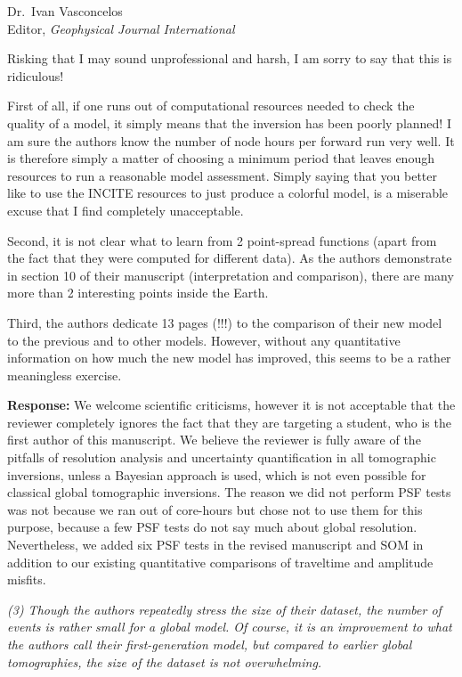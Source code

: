 \documentclass[11pt,a4paper]{letter}
\newcommand{\response}[1]{\textbf{Response:} #1}
\newcommand{\rev}[1]{{\it{#1}}}
\begin{document}
\begin{letter}{Dr.~Ivan Vasconcelos\\
Editor, \textit{Geophysical Journal International}}
{Risking that I may sound unprofessional and harsh, I am sorry to say that this is ridiculous!

First of all, if one runs out of computational resources needed to check the quality of a model, it simply means that the inversion has been poorly planned! I am sure the authors know the number of node hours per forward run very well. It is therefore simply a matter of choosing a minimum period that leaves enough resources to run a reasonable model assessment. Simply saying that you better like to use the INCITE resources to just produce a colorful model, is a miserable excuse that I find completely unacceptable.

Second, it is not clear what to learn from 2 point-spread functions (apart from the fact that they were computed for different data). As the authors demonstrate in section 10 of their manuscript (interpretation and comparison), there are many more than 2 interesting points inside the Earth.

Third, the authors dedicate 13 pages (!!!) to the comparison of their new model to the previous and to other models. However, without any quantitative information on how much the new model has improved, this seems to be a rather meaningless exercise.
}

\response{We welcome scientific criticisms, however it is not acceptable that the reviewer completely ignores the fact that they are targeting a student,
who is the first author of this manuscript.
We believe the reviewer is fully aware of the pitfalls of resolution analysis and uncertainty quantification in all tomographic inversions, unless a Bayesian approach is used, which is not even possible for classical global tomographic inversions.
The reason we did not perform PSF tests was not because we ran out of core-hours but chose not to use them for this purpose,
because a few PSF tests do not say much about global resolution.
Nevertheless, we added six PSF tests in the revised manuscript and SOM in addition to our existing quantitative comparisons of traveltime and amplitude misfits.
}

\rev{(3) Though the authors repeatedly stress the size of their dataset, the number of events is rather small for a global model. Of course, it is an improvement to what the authors call their first-generation model, but compared to earlier global tomographies, the size of the dataset is not overwhelming.
}


\end{letter}
\end{document}
